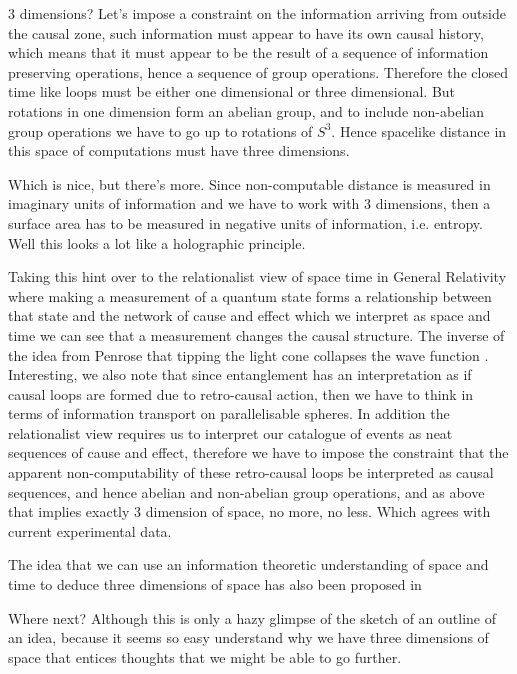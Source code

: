 \documentclass[final]{beamer}
\newlength{\colwidth}
\begin{document}
\begin{frame}[t]
\begin{columns}[t]
\begin{column}{\colwidth}
\begin{block}{3 dimensions?}
    Let's impose a constraint on the information arriving from outside the causal zone, such information must appear to have its own causal history, which means that it must appear to be the result of a sequence of information preserving operations, hence a sequence of group operations. Therefore the closed time like loops must be either one dimensional or three dimensional. But rotations in one dimension form an abelian group, and to include non-abelian group operations we have to go up to rotations of $S^3$. Hence spacelike distance in this space of computations must have three dimensions. 

    Which is nice, but there's more. Since non-computable distance is measured in imaginary units of information and we have to work with 3 dimensions, then a surface area has to be measured in negative units of information, i.e. entropy. Well this looks a lot like a holographic principle. 

    Taking this hint over to the relationalist view of space time in General Relativity where making a measurement of a quantum state forms a relationship between that state and the network of cause and effect which we interpret as space and time we can see that a measurement changes the causal structure. The inverse of the idea from Penrose that tipping the light cone collapses the wave function \autocite{Penrose1996}. Interesting, we also note that since entanglement has an interpretation as if causal loops are formed due to retro-causal action, then we have to think in terms of information transport on parallelisable spheres. In addition the relationalist view requires us to interpret our catalogue of events as neat sequences of cause and effect, therefore we have to impose the constraint that the apparent non-computability of these retro-causal loops be interpreted as causal sequences, and hence abelian and non-abelian group operations, and as above that implies exactly 3 dimension of space, no more, no less. Which agrees with current experimental data. 

    The idea that we can use an information theoretic understanding of space and time to deduce three dimensions of space has also been proposed in \autocite{muller_p_2012}
\end{block}


\begin{block}{Where next?}
  Although this is only a hazy glimpse of the sketch of an outline of an idea, because it seems so easy understand why we have three dimensions of space that entices thoughts that we might be able to go further. 
  

\end{block}
\end{column}
\end{columns}
\end{frame}
\end{document}
